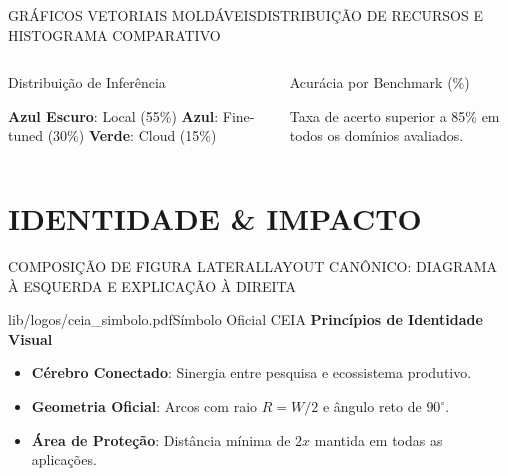 \documentclass[aspectratio=169,t,xcolor=table]{beamer}
\begin{document}
\begin{frame}{GRÁFICOS VETORIAIS MOLDÁVEIS}{DISTRIBUIÇÃO DE RECURSOS E HISTOGRAMA COMPARATIVO}
    \begin{columns}[c]
        \begin{ceiacard}[top=2pt, bottom=2pt]{Distribuição de Inferência}
            \centering\vspace{0.1em}
            \par\vspace{0.2em}
            {\tiny \textbf{Azul Escuro}: Local (55\%) \quad \textbf{Azul}: Fine-tuned (30\%) \quad \textbf{Verde}: Cloud (15\%)}
        \end{ceiacard}

        \begin{ceiacard}[top=2pt, bottom=2pt]{Acurácia por Benchmark (\%)}
            \centering\vspace{0.1em}
            \par\vspace{0.2em}
            {\tiny Taxa de acerto superior a 85\% em todos os domínios avaliados.}
        \end{ceiacard}
    \end{columns}
\end{frame}

\section{IDENTIDADE \& IMPACTO}
\begin{frame}{COMPOSIÇÃO DE FIGURA LATERAL}{LAYOUT CANÔNICO: DIAGRAMA À ESQUERDA E EXPLICAÇÃO À DIREITA}
    \begin{ceiasidefigure}{lib/logos/ceia_simbolo.pdf}{Símbolo Oficial CEIA}
        {\small\bfseries\color{CEIADarkBlue} Princípios de Identidade Visual}\par\vspace{0.3em}
        \begin{itemize}
            \setlength{\itemsep}{0.3em}
            \item \textbf{Cérebro Conectado}: Sinergia entre pesquisa e ecossistema produtivo.
            \item \textbf{Geometria Oficial}: Arcos com raio $R = W/2$ e ângulo reto de $90^\circ$.
            \item \textbf{Área de Proteção}: Distância mínima de $2x$ mantida em todas as aplicações.
        \end{itemize}
    \end{ceiasidefigure}
\end{frame}
\end{document}

